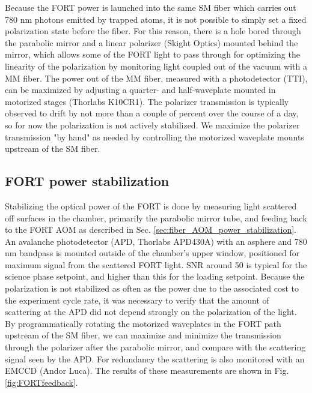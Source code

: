 
Because the FORT power is launched into the same SM fiber which carries out 780 nm photons emitted by trapped atoms, it is not possible to simply set a fixed polarization state before the fiber. For this reason, there is a hole bored through the parabolic mirror and a linear polarizer (Skight Optics) mounted behind the mirror, which allows some of the FORT light to pass through for optimizing the linearity of the polarization by monitoring light coupled out of the vacuum with a MM fiber. The power out of the MM fiber, measured with a photodetector (TTI), can be maximized by adjusting a quarter- and half-waveplate mounted in motorized stages (Thorlabs K10CR1). The polarizer transmission is typically observed to drift by not more than a couple of percent over the course of a day, so for now the polarization is not actively stabilized. We maximize the polarizer transmission "by hand" as needed by controlling the motorized waveplate mounts upstream of the SM fiber.


\subsection{FORT power stabilization}

Stabilizing the optical power of the FORT is done by measuring light scattered off surfaces in the chamber, primarily the parabolic mirror tube, and feeding back to the FORT AOM as described in Sec. \ref{sec:fiber_AOM_power_stabilization}. An avalanche photodetector (APD, Thorlabs APD430A) with an asphere and 780 nm bandpass is mounted outside of the chamber's upper window, positioned for maximum signal from the scattered FORT light. SNR around 50 is typical for the science phase setpoint, and higher than this for the loading setpoint. Because the polarization is not stabilized as often as the power due to the associated cost to the experiment cycle rate, it was necessary to verify that the amount of scattering at the APD did not depend strongly on the polarization of the light. By programmatically rotating the motorized waveplates in the FORT path upstream of the SM fiber, we can maximize and minimize the transmission through the polarizer after the parabolic mirror, and compare with the scattering signal seen by the APD. For redundancy the scattering is also monitored with an EMCCD (Andor Luca). The results of these measurements are shown in Fig. \ref{fig:FORTfeedback}.

